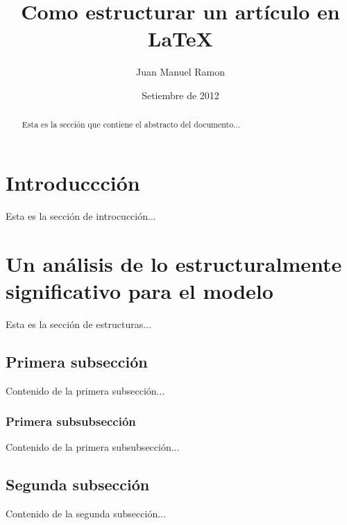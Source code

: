 \documentclass{article}
\begin{document}
\title{Como estructurar un artículo en LaTeX}
\author{Juan Manuel Ramon}
\date{Setiembre de 2012}
\maketitle

\begin{abstract}
Esta es la sección que contiene el abstracto del documento...
\end{abstract}
\newpage

\tableofcontents
\newpage

\section{Introduccción}
Esta es la sección de introcucción...

\section[Estructura]{Un análisis de lo estructuralmente significativo para el 
modelo}
Esta es la sección de estructuras...

\subsection{Primera subsección}
Contenido de la primera subsección...

\subsubsection{Primera subsubsección}
Contenido de la primera subsubsección...

\subsection{Segunda subsección}
Contenido de la segunda subsección...
\end{document}
